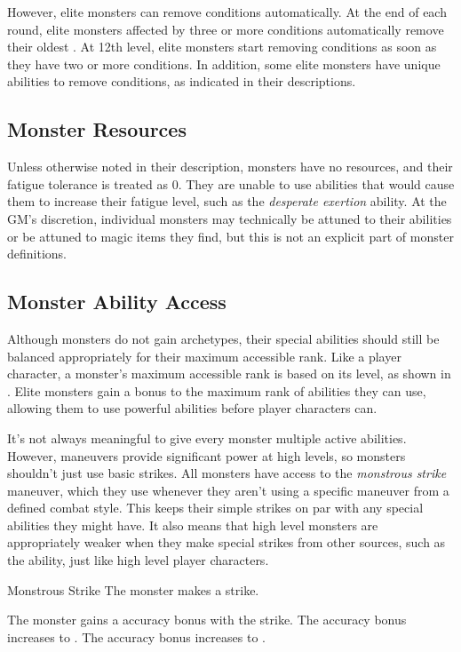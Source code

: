             However, elite monsters can remove conditions automatically.
            At the end of each round, elite monsters affected by three or more conditions automatically remove their oldest .
            At 12th level, elite monsters start removing conditions as soon as they have two or more conditions.
            In addition, some elite monsters have unique abilities to remove conditions, as indicated in their descriptions.

        \subsection{Monster Resources}
            Unless otherwise noted in their description, monsters have no resources, and their fatigue tolerance is treated as 0.
            They are unable to use abilities that would cause them to increase their fatigue level, such as the \textit{desperate exertion} ability.
            At the GM's discretion, individual monsters may technically be attuned to their abilities or be attuned to magic items they find, but this is not an explicit part of monster definitions.

        \subsection{Monster Ability Access}\label{Monster Ability Access}
            Although monsters do not gain archetypes, their special abilities should still be balanced appropriately for their maximum accessible rank.
            Like a player character, a monster's maximum accessible rank is based on its level, as shown in .
            Elite monsters gain a  bonus to the maximum rank of abilities they can use, allowing them to use powerful abilities before player characters can.

            It's not always meaningful to give every monster multiple active abilities.
            However, maneuvers provide significant power at high levels, so monsters shouldn't just use basic strikes.
            All monsters have access to the \textit{monstrous strike} maneuver, which they use whenever they aren't using a specific maneuver from a defined combat style.
            This keeps their simple strikes on par with any special abilities they might have.
            It also means that high level monsters are appropriately weaker when they make special strikes from other sources, such as the  ability, just like high level player characters.
            \begin{activeability}{Monstrous Strike}
                \rankline
                The monster makes a strike.

                \rankline
                 The monster gains a  accuracy bonus with the strike.
                 The accuracy bonus increases to .
                 The accuracy bonus increases to .
            \end{activeability}

